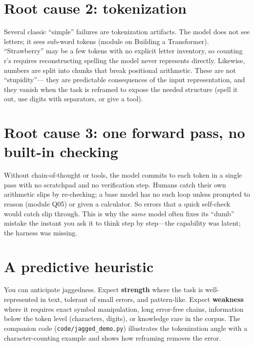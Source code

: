 \documentclass[11pt]{article}
\begin{document}
\section{Root cause 2: tokenization}
Several classic ``simple'' failures are tokenization artifacts. The model does not see letters; it sees
sub-word tokens (module on Building a Transformer). ``Strawberry'' may be a few tokens with no explicit
letter inventory, so counting r's requires reconstructing spelling the model never represents directly.
Likewise, numbers are split into chunks that break positional arithmetic. These are not ``stupidity''---
they are predictable consequences of the input representation, and they vanish when the task is reframed
to expose the needed structure (spell it out, use digits with separators, or give a tool).

\section{Root cause 3: one forward pass, no built-in checking}
Without chain-of-thought or tools, the model commits to each token in a single pass with no scratchpad and
no verification step. Humans catch their own arithmetic slips by re-checking; a base model has no such loop
unless prompted to reason (module Q05) or given a calculator. So errors that a quick self-check would catch
slip through. This is why the \emph{same} model often fixes its ``dumb'' mistake the instant you ask it to
think step by step---the capability was latent; the harness was missing.

\section{A predictive heuristic}
You can anticipate jaggedness. Expect \textbf{strength} where the task is well-represented in text,
tolerant of small errors, and pattern-like. Expect \textbf{weakness} where it requires exact symbol
manipulation, long error-free chains, information below the token level (characters, digits), or
knowledge rare in the corpus. The companion code (\texttt{code/jagged\_demo.py}) illustrates the
tokenization angle with a character-counting example and shows how reframing removes the error.
\end{document}
